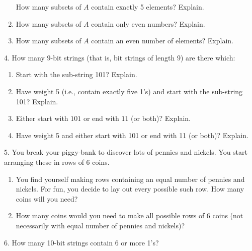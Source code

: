 \documentclass[12pt,]{book}
\theoremstyle{plain}
\theoremstyle{definition}
\theoremstyle{definition}
\theoremstyle{definition}
\numberwithin{equation}{chapter}
\begin{document}
\begin{exerciselist}
\begin{enumerate}[label=(\alph*)]
How many subsets of \(A\) contain exactly 5 elements? Explain. %
\item\hypertarget{li-410}{}\hypertarget{p-880}{}%
How many subsets of \(A\) contain only even numbers? Explain. %
\item\hypertarget{li-411}{}\hypertarget{p-881}{}%
How many subsets of \(A\) contain an even number of elements? Explain. %
\end{enumerate}
%
\par\smallskip
\item[4.]\hypertarget{exercise-105}{}\hypertarget{p-882}{}%
How many \(9\)-bit strings (that is, bit strings of length 9) are there which: \leavevmode%
\begin{enumerate}[label=(\alph*)]
\item\hypertarget{li-412}{}\hypertarget{p-883}{}%
Start with the sub-string 101? Explain. %
\item\hypertarget{li-413}{}\hypertarget{p-884}{}%
Have weight 5 (i.e., contain exactly five 1's) and start with the sub-string 101? Explain. %
\item\hypertarget{li-414}{}\hypertarget{p-885}{}%
Either start with \(101\) or end with \(11\) (or both)? Explain. %
\item\hypertarget{li-415}{}\hypertarget{p-886}{}%
Have weight 5 and either start with 101 or end with 11 (or both)? Explain. %
\end{enumerate}
%
\par\smallskip
\item[5.]\hypertarget{exercise-106}{}\hypertarget{p-887}{}%
You break your piggy-bank to discover lots of pennies and nickels. You start arranging these in rows of 6 coins. \leavevmode%
\begin{enumerate}[label=(\alph*)]
\item\hypertarget{li-416}{}\hypertarget{p-888}{}%
You find yourself making rows containing an equal number of pennies and nickels.  For fun, you decide to lay out every possible such row.  How many coins will you need?%
\item\hypertarget{li-417}{}\hypertarget{p-889}{}%
How many coins would you need to make all possible rows of 6 coins (not necessarily with equal number of pennies and nickels)?%
\end{enumerate}
%
\par\smallskip
\item[6.]\hypertarget{exercise-107}{}\hypertarget{p-893}{}%
How many 10-bit strings contain 6 or more 1's?%
\par\smallskip

\end{exerciselist}
\end{document}
